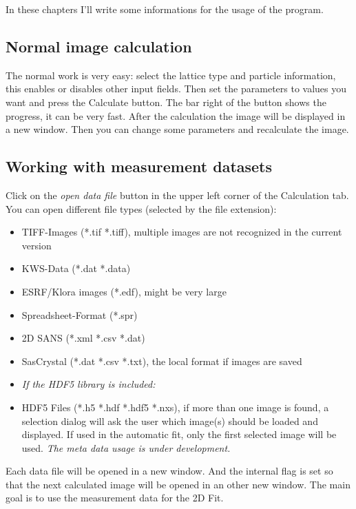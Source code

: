 \documentclass[11pt]{article} %
\begin{document}
In these chapters I'll write some informations for the usage of the program.

\subsection{Normal image calculation}

The normal work is very easy: select the lattice type and particle information, this enables or disables other input fields. Then set the parameters to values you want and press the Calculate button. The bar right of the button shows the progress, it can be very fast. After the calculation the image will be displayed in a new window. Then you can change some parameters and recalculate the image.

\subsection{Working with measurement datasets}

Click on the {\it open data file} button in the upper left corner of the Calculation tab. You can open different file types (selected by the file extension):
	\begin{itemize}\itemsep0pt
	\item TIFF-Images (*.tif *.tiff), multiple images are not recognized in the current version
	\item KWS-Data (*.dat *.data)
	\item ESRF/Klora images (*.edf), might be very large
	\item Spreadsheet-Format (*.spr)
	\item 2D SANS (*.xml *.csv *.dat)
	\item SasCrystal (*.dat *.csv *.txt), the local format if images are saved
	\item[] {\it If the HDF5 library is included:}
	\item HDF5 Files (*.h5 *.hdf *.hdf5 *.nxs), if more than one image is found, a selection dialog will ask the user which image(s) should be loaded and displayed. If used in the automatic fit, only the first selected image will be used. {\it The meta data usage is under development.}
	\end{itemize}
Each data file will be opened in a new window. And the internal flag is set so that the next calculated image will be opened in an other new window. The main goal is to use the measurement data for the 2D Fit.
\end{document}
